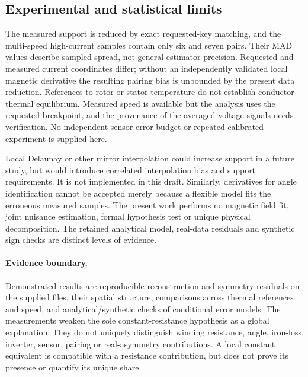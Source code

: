 \subsection{Experimental and statistical limits}
The measured support is reduced by exact requested-key matching, and the
multi-speed high-current samples contain only six and seven pairs. Their
MAD values describe sampled spread, not general estimator precision.
Requested and measured current coordinates differ; without an independently
validated local magnetic derivative the resulting pairing bias is unbounded
by the present data reduction. References to rotor or stator temperature do
not establish conductor thermal equilibrium. Measured speed is available
but the analysis uses the requested breakpoint, and the provenance of the
averaged voltage signals needs verification. No independent sensor-error
budget or repeated calibrated experiment is supplied here.

Local Delaunay or other mirror interpolation could increase support in a
future study, but would introduce correlated interpolation bias and support
requirements. It is not implemented in this draft. Similarly, derivatives
for angle identification cannot be accepted merely because a flexible model
fits the erroneous measured samples. The present work performs no magnetic
field fit, joint nuisance estimation, formal hypothesis test or unique
physical decomposition. The retained analytical model, real-data residuals
and synthetic sign checks are distinct levels of evidence.

\paragraph{Evidence boundary.}
Demonstrated results are reproducible reconstruction and symmetry residuals
on the supplied files, their spatial structure, comparisons across thermal
references and speed, and analytical/synthetic checks of conditional error
models. The measurements weaken the sole constant-resistance hypothesis as
a global explanation. They do not uniquely distinguish winding resistance,
angle, iron-loss, inverter, sensor, pairing or real-asymmetry contributions.
A local constant equivalent is compatible with a resistance contribution,
but does not prove its presence or quantify its unique share.
